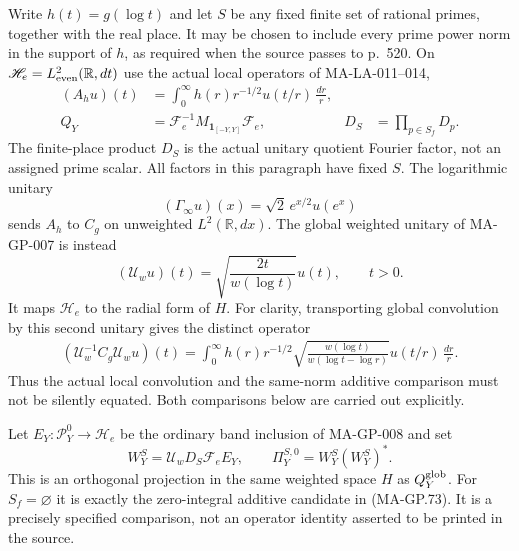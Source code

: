 Write $h(t)=g(\log t)$ and let $S$ be any fixed finite set
of rational primes, together with the real place.  It may
be chosen to include every prime power norm in the support
of $h$, as required when the source passes to p.~520.
On $\mathscr H_e=L^2_{\rm even}(\mathbb R,dt)$ use the
actual local operators of MA-LA-011--014,
\[
 \begin{aligned}
 (A_hu)(t)&=\int_0^\infty h(r)r^{-1/2}u(t/r)\,\frac{dr}{r},\\
 Q_Y&=\mathcal F_e^{-1}M_{\mathbf1_{[-Y,Y]}}\mathcal F_e,&
 D_S&=\prod_{p\in S_f}D_p .
 \end{aligned}
 \tag{MA-JP.9}
\]
The finite-place product $D_S$ is the actual unitary
quotient Fourier factor, not an assigned prime scalar.
All factors in this paragraph have fixed $S$.
The logarithmic unitary
\[
 (\Gamma_\infty u)(x)=\sqrt2\,e^{x/2}u(e^x)
 \tag{MA-JP.10}
\]
sends $A_h$ to $C_g$ on unweighted $L^2(\mathbb R,dx)$.
The global weighted unitary of MA-GP-007 is instead
\[
 (\mathcal U_wu)(t)
       =\sqrt{\frac{2t}{w(\log t)}}u(t),\qquad t>0 .
 \tag{MA-JP.11}
\]
It maps $\mathscr H_e$ to the radial form of $H$.
For clarity, transporting global convolution by this
second unitary gives the distinct operator
\[
 \begin{split}
 (\mathcal U_w^{-1}C_g\mathcal U_wu)(t)
 =\int_0^\infty h(r)r^{-1/2}
       \sqrt{\frac{w(\log t)}{w(\log t-\log r)}}
                  u(t/r)\,\frac{dr}{r}.
 \end{split}
 \tag{MA-JP.12}
\]
Thus the actual local convolution and the same-norm
additive comparison must not be silently equated.
Both comparisons below are carried out explicitly.

Let $E_Y:\mathcal P_Y^0\to\mathscr H_e$ be the ordinary
band inclusion of MA-GP-008 and set
\[
 W_Y^S=\mathcal U_wD_S\mathcal F_eE_Y,\qquad
 \Pi_Y^{S,0}=W_Y^S(W_Y^S)^* .
 \tag{MA-JP.13}
\]
This is an orthogonal projection in the same weighted
space $H$ as $Q_Y^{\rm glob}$.
For $S_f=\varnothing$ it is exactly the zero-integral
additive candidate in (MA-GP.73).
It is a precisely specified comparison, not an
operator identity asserted to be printed in the source.

